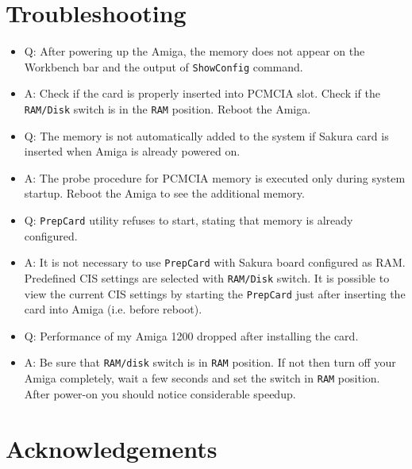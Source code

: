 \documentclass[10pt,a4paper]{article}
\begin{document}
\section*{Troubleshooting}

\begin{itemize}
	\item Q: After powering up the Amiga, the memory does not appear on the Workbench bar and the output of {\tt ShowConfig} command.
	\item A: Check if the card is properly inserted into PCMCIA slot. Check if the {\tt RAM/Disk} switch is in the {\tt RAM} position. Reboot the Amiga.
\end{itemize}

\begin{itemize}
	\item Q: The memory is not automatically added to the system if Sakura card is inserted when Amiga is already powered on. 
	\item A: The probe procedure for PCMCIA memory is executed only during system startup. Reboot the Amiga to see the additional memory. 
\end{itemize}

\begin{itemize}
	\item Q: {\tt PrepCard} utility refuses to start, stating that memory is already configured. 
	\item A: It is not necessary to use {\tt PrepCard} with Sakura board configured as RAM. Predefined CIS settings are selected with {\tt RAM/Disk} switch. It is possible to view the current CIS settings by starting the {\tt PrepCard} just after inserting the card into Amiga (i.e. before reboot). 
\end{itemize}

\begin{itemize}
	\item Q: Performance of my Amiga 1200 dropped after installing the card.
	\item A: Be sure that {\tt RAM/disk} switch is in {\tt RAM} position. If not then turn off your Amiga completely, wait a few seconds and set the switch in {\tt RAM} position. After power-on you should notice considerable speedup.
\end{itemize}

\section*{Acknowledgements}
\end{document}
